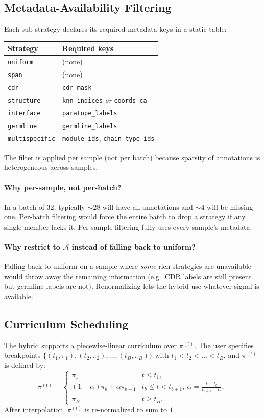 \documentclass[11pt]{article}
\begin{document}
\subsection{Metadata-Availability Filtering}
Each sub-strategy declares its required metadata keys in a static
table:
\begin{center}
\begin{tabular}{ll}
\toprule
Strategy & Required keys \\
\midrule
\texttt{uniform} & (none) \\
\texttt{span} & (none) \\
\texttt{cdr} & \texttt{cdr\_mask} \\
\texttt{structure} & \texttt{knn\_indices} \emph{or} \texttt{coords\_ca} \\
\texttt{interface} & \texttt{paratope\_labels} \\
\texttt{germline} & \texttt{germline\_labels} \\
\texttt{multispecific} & \texttt{module\_ids}, \texttt{chain\_type\_ids} \\
\bottomrule
\end{tabular}
\end{center}
The filter is applied per sample (not per batch) because sparsity of
annotations is heterogeneous across samples.

\paragraph{Why per-sample, not per-batch?} In a batch of 32, typically
$\sim 28$ will have all annotations and $\sim 4$ will be missing one.
Per-batch filtering would force the entire batch to drop a strategy if
any single member lacks it. Per-sample filtering fully uses every
sample's metadata.

\paragraph{Why restrict to $\mathcal{A}$ instead of falling back to
uniform?} Falling back to uniform on a sample where \emph{some} rich
strategies are unavailable would throw away the remaining information
(e.g.\ CDR labels are still present but germline labels are not).
Renormalizing lets the hybrid use whatever signal is available.

\subsection{Curriculum Scheduling}
The hybrid supports a piecewise-linear curriculum over $\pi^{(t)}$.
The user specifies breakpoints
$\{(t_1, \pi_1), (t_2, \pi_2), \ldots, (t_B, \pi_B)\}$ with
$t_1 < t_2 < \ldots < t_B$, and $\pi^{(t)}$ is defined by:
\begin{equation}
\pi^{(t)} = \begin{cases}
\pi_1 & t \le t_1, \\
(1 - \alpha) \pi_b + \alpha \pi_{b+1} & t_b \le t < t_{b+1},\ \alpha = \frac{t - t_b}{t_{b+1} - t_b}, \\
\pi_B & t \ge t_B.
\end{cases}
\end{equation}
After interpolation, $\pi^{(t)}$ is re-normalized to sum to $1$.
\end{document}
